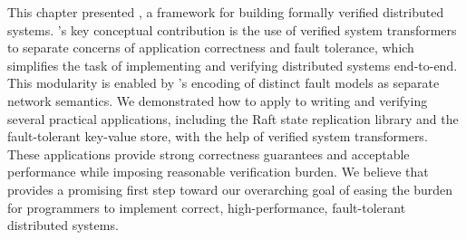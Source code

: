 This chapter presented \Verdi, a framework for building formally
verified distributed systems.  \Verdi's key conceptual contribution is
the use of verified system transformers to separate concerns of
application correctness and fault tolerance, which simplifies the task
of implementing and verifying distributed systems end-to-end. This
modularity is enabled by \Verdi's encoding of distinct fault models as
separate network semantics.  We demonstrated how to apply \Verdi to
writing and verifying several practical applications, including the
Raft state replication library and the \vard fault-tolerant key-value
store, with the help of verified system transformers.  These
applications provide strong correctness guarantees and acceptable
performance while imposing reasonable verification burden. We believe
that \Verdi provides a promising first step toward our overarching
goal of easing the burden for programmers to implement correct,
high-performance, fault-tolerant distributed systems.
